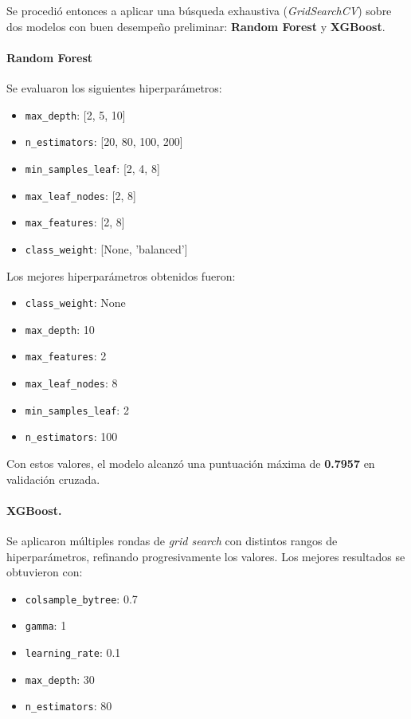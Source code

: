 \documentclass[12pt]{article}
\begin{document}
Se procedió entonces a aplicar una búsqueda exhaustiva (\textit{GridSearchCV}) sobre dos modelos con buen desempeño preliminar: \textbf{Random Forest} y \textbf{XGBoost}.

\paragraph{Random Forest}
Se evaluaron los siguientes hiperparámetros:

\begin{itemize}
    \item \texttt{max\_depth}: [2, 5, 10]
    \item \texttt{n\_estimators}: [20, 80, 100, 200]
    \item \texttt{min\_samples\_leaf}: [2, 4, 8]
    \item \texttt{max\_leaf\_nodes}: [2, 8]
    \item \texttt{max\_features}: [2, 8]
    \item \texttt{class\_weight}: [None, 'balanced']
\end{itemize}

Los mejores hiperparámetros obtenidos fueron:

\begin{itemize}
    \item \texttt{class\_weight}: None
    \item \texttt{max\_depth}: 10
    \item \texttt{max\_features}: 2
    \item \texttt{max\_leaf\_nodes}: 8
    \item \texttt{min\_samples\_leaf}: 2
    \item \texttt{n\_estimators}: 100
\end{itemize}

Con estos valores, el modelo alcanzó una puntuación máxima de \textbf{0.7957} en validación cruzada.


\paragraph{XGBoost.}
Se aplicaron múltiples rondas de \textit{grid search} con distintos rangos de hiperparámetros, refinando progresivamente los valores. Los mejores resultados se obtuvieron con:

\begin{itemize}
    \item \texttt{colsample\_bytree}: 0.7
    \item \texttt{gamma}: 1
    \item \texttt{learning\_rate}: 0.1
    \item \texttt{max\_depth}: 30
    \item \texttt{n\_estimators}: 80
\end{itemize}
\end{document}
